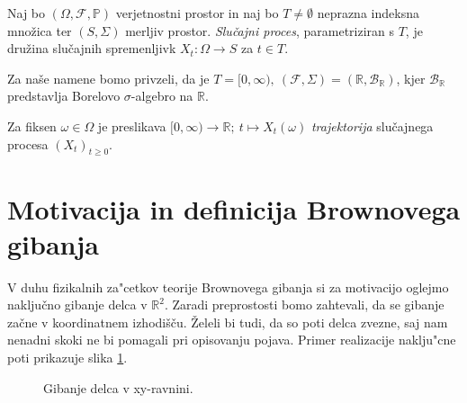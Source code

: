 \documentclass[twoside,11pt]{article}
\begin{document}
\begin{definicija}
    Naj bo $(\Omega, \mathcal{F}, \mathbb{P})$ verjetnostni prostor in naj bo $T\neq\emptyset$ neprazna
    indeksna množica ter $(S, \Sigma)$ merljiv prostor. \textit{Slučajni proces}, parametriziran
    s $T$, je družina slučajnih spremenljivk $X_t : \Omega \to S$ za $t \in T$.
\end{definicija}

\begin{opomba}
    Za naše namene bomo privzeli, da je $T = [0, \infty), \ (\mathcal{F}, \Sigma) = (\mathbb{R}, \mathcal{B}_{\mathbb{R}})$,
    kjer $\mathcal{B}_{\mathbb{R}}$ predstavlja Borelovo $\sigma$-algebro na $\mathbb{R}$. 
\end{opomba}
    
\begin{definicija}
    Za fiksen $\omega \in \Omega$ je preslikava 
    $[0, \infty) \rightarrow \mathbb{R}; \ t \mapsto X_t(\omega)$ 
    \textit{trajektorija} slučajnega procesa $(X_t)_{t\geq0}$.
\end{definicija}


\pagebreak

\section{Motivacija in definicija Brownovega gibanja}

V duhu fizikalnih za"cetkov teorije Brownovega gibanja si za motivacijo oglejmo naključno gibanje delca v $\mathbb{R}^2$.
Zaradi preprostosti bomo zahtevali, da se gibanje začne v koordinatnem izhodišču. Želeli bi tudi, da so 
poti delca zvezne, saj nam nenadni skoki ne bi pomagali pri opisovanju pojava. Primer realizacije naklju"cne
poti prikazuje slika \ref{fig:slika1}.

\begin{figure}[h]
    \centering

    \caption{Gibanje delca v xy-ravnini.}
    \label{fig:slika1}
\end{figure}
\end{document}
